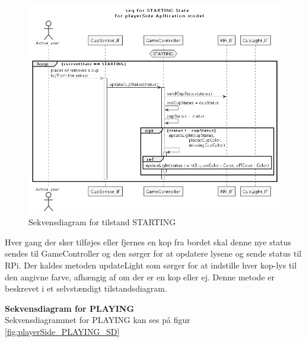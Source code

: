 \documentclass[Arkitektur/System_main.tex]{subfiles}
\begin{document}
\begin{figure}[H]
    \centering
    \includegraphics[width=\textwidth]{Arkitektur/Softwarearkitektur/Applikationsmodel/PlayerSide/graphics/UC1_sequence.png}
    \caption{Sekvensdiagram for tilstand STARTING}
    \label{fig:playerSide_STARTING_SD}
\end{figure}
Hver gang der sker tilføjes eller fjernes en kop fra bordet skal denne nye status sendes til GameController og den sørger for at opdatere lysene og sende status til RPi. Der kaldes metoden updateLight som sørger for at indstille hver kop-lys til den angivne farve, afhængig af om der er en kop eller ej. Denne metode er beskrevet i et selvstændigt tilstandsdiagram.

\textbf{Sekvensdiagram for PLAYING}\\
Sekvensdiagrammet for PLAYING kan ses på figur \ref{fig:playerSide_PLAYING_SD}
\end{document}
